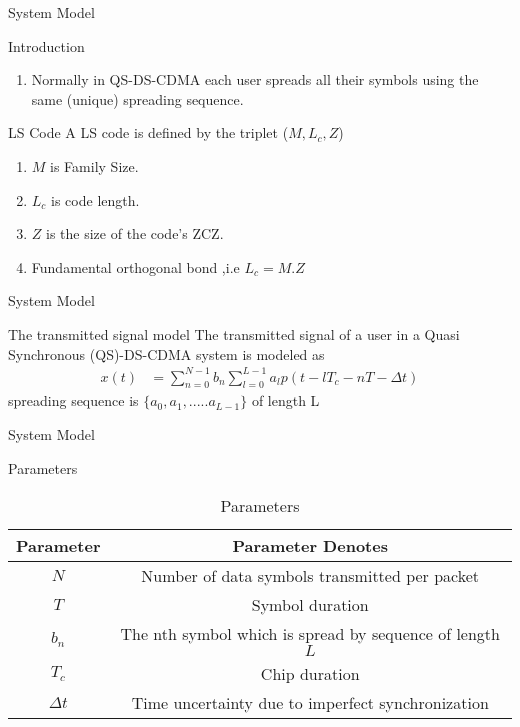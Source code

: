 \documentclass{beamer}
\begin{document}
\begin{frame}{System Model}
\begin{block}{Introduction }
\begin{enumerate}
     \item Normally in QS-DS-CDMA each user spreads all their symbols using the same (unique) spreading sequence.
\end{enumerate}
\end{block}
\begin{block}{ LS Code }
 A LS code is defined by the triplet ($M,{L}_{c},Z$)
\begin{enumerate}
     \item $M$ is Family Size.
     \item $L_{c}$ is code length.
     \item  $Z$ is the size of the code’s ZCZ.
     \item Fundamental orthogonal bond ,i.e $L_{c} = M.Z$
\end{enumerate}
\end{block}
\end{frame}


\begin{frame}{System Model}
\begin{block}{The transmitted signal  model}
    The transmitted signal of a user in a Quasi Synchronous (QS)-DS-CDMA system is modeled as
\begin{align}
    x(t)& = \sum_{n = 0}^{N-1}b_{n}\sum_{l= 0}^{L-1}a_{l}p(t - lT_{c} -nT - \Delta t)
    \label{eq1}
\end{align}
spreading sequence is $\{a_{0},a_{1},.....a_{L-1}\}$ of length L
\end{block}
\end{frame}

\begin{frame}{System Model}
\begin{block}{Parameters}
\begin{table}[]
\centering
\renewcommand{\arraystretch}{1.4}
\begin{tabular}{|c|c|}
        \hline
        Parameter& Parameter Denotes \\ \hline
        $N$ & Number of data symbols transmitted per packet\\ \hline
        $T$ & Symbol duration\\ \hline
        $b_{n}$ &  The nth symbol which is spread by  sequence of length $L$\\ \hline
        $T_{c}$ & Chip duration \\ \hline
        $\Delta t$ & Time uncertainty due to imperfect synchronization \\ \hline
\end{tabular}
\caption{Parameters}
\label{tab:my_label}
\end{table}
\end{block}
    
\end{frame}
\end{document}
